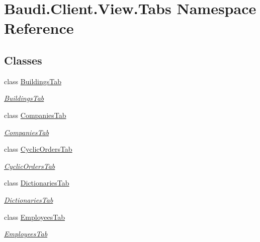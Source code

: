\hypertarget{namespace_baudi_1_1_client_1_1_view_1_1_tabs}{}\section{Baudi.\+Client.\+View.\+Tabs Namespace Reference}
\label{namespace_baudi_1_1_client_1_1_view_1_1_tabs}
\subsection*{Classes}
\begin{DoxyCompactItemize}
\item 
class \hyperlink{class_baudi_1_1_client_1_1_view_1_1_tabs_1_1_buildings_tab}{Buildings\+Tab}
\begin{DoxyCompactList}\small\item\em \hyperlink{class_baudi_1_1_client_1_1_view_1_1_tabs_1_1_buildings_tab}{Buildings\+Tab} \end{DoxyCompactList}\item 
class \hyperlink{class_baudi_1_1_client_1_1_view_1_1_tabs_1_1_companies_tab}{Companies\+Tab}
\begin{DoxyCompactList}\small\item\em \hyperlink{class_baudi_1_1_client_1_1_view_1_1_tabs_1_1_companies_tab}{Companies\+Tab} \end{DoxyCompactList}\item 
class \hyperlink{class_baudi_1_1_client_1_1_view_1_1_tabs_1_1_cyclic_orders_tab}{Cyclic\+Orders\+Tab}
\begin{DoxyCompactList}\small\item\em \hyperlink{class_baudi_1_1_client_1_1_view_1_1_tabs_1_1_cyclic_orders_tab}{Cyclic\+Orders\+Tab} \end{DoxyCompactList}\item 
class \hyperlink{class_baudi_1_1_client_1_1_view_1_1_tabs_1_1_dictionaries_tab}{Dictionaries\+Tab}
\begin{DoxyCompactList}\small\item\em \hyperlink{class_baudi_1_1_client_1_1_view_1_1_tabs_1_1_dictionaries_tab}{Dictionaries\+Tab} \end{DoxyCompactList}\item 
class \hyperlink{class_baudi_1_1_client_1_1_view_1_1_tabs_1_1_employees_tab}{Employees\+Tab}
\begin{DoxyCompactList}\small\item\em \hyperlink{class_baudi_1_1_client_1_1_view_1_1_tabs_1_1_employees_tab}{Employees\+Tab} \end{DoxyCompactList}\item 

\end{DoxyCompactItemize}
